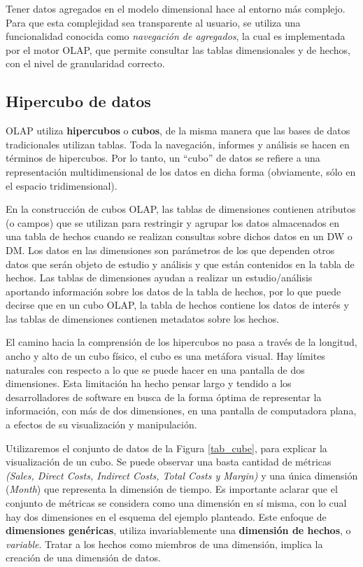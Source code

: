 \documentclass[a4paper,11pt]{article}
\begin{document}
    Tener datos agregados en el modelo dimensional hace al entorno más complejo. Para que esta complejidad sea transparente al usuario, se utiliza
    una funcionalidad conocida como \textit{navegación de agregados}, la cual es implementada por el motor OLAP, que permite consultar las
    tablas dimensionales y de hechos, con el nivel de granularidad correcto.
    
    
    \subsection{Hipercubo de datos}
    
    OLAP utiliza \textbf{hipercubos} o \textbf{cubos}, de la misma manera que las bases de datos tradicionales utilizan tablas.
    Toda la navegación, informes y análisis se hacen en términos de hipercubos.
    Por lo tanto, un ``cubo'' de datos se refiere a una representación multidimensional de los datos en dicha forma (obviamente, sólo en el espacio tridimensional).
    
    En la construcción de cubos OLAP, las tablas de dimensiones contienen atributos (o campos) que se utilizan para restringir y agrupar
    los datos almacenados en una tabla de hechos cuando se realizan consultas sobre dichos datos en un DW o DM. Los datos en las dimensiones son parámetros
    de los que dependen otros datos que serán objeto de estudio y análisis y que están contenidos en la tabla de hechos. Las tablas de dimensiones ayudan a
    realizar un estudio/análisis aportando información sobre los datos de la tabla de hechos, por lo que puede decirse que en un cubo OLAP, la tabla de
    hechos contiene los datos de interés y las tablas de dimensiones contienen metadatos sobre los hechos.

    El camino hacia la comprensión de los hipercubos no pasa a través de la longitud, ancho y alto de un cubo físico, el cubo es una metáfora visual. Hay
    límites naturales con respecto a lo que se puede hacer en una pantalla de dos dimensiones. Esta limitación ha hecho pensar largo y tendido a los
    desarrolladores de software en busca de la forma óptima de representar la información, con más de dos dimensiones, en una pantalla de computadora plana,
    a efectos de su visualización y manipulación.
    
    Utilizaremos el conjunto de datos de la Figura \ref{tab_cube}, para explicar la visualización de un cubo. Se puede observar una basta cantidad de
    métricas \textit{(Sales, Direct Costs, Indirect Costs, Total Costs y Margin)} y una única dimensión (\textit{Month}) que representa la dimensión de tiempo.
    Es importante aclarar que el conjunto de métricas se considera como una dimensión en sí misma, con lo cual hay dos dimensiones en el esquema del ejemplo planteado.
    Este enfoque de \textbf{dimensiones genéricas}, utiliza invariablemente una \textbf{dimensión de hechos}, o \textit{variable}.
    Tratar a los hechos como miembros de una dimensión, implica la creación de una dimensión de datos. 
    
\end{document}
